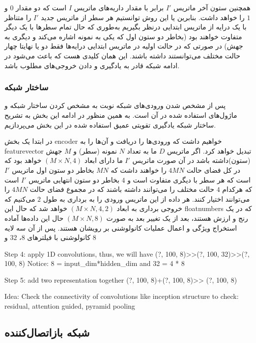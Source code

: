 همچنین ستون آخر ماتریس $I'$ برابر با مقدار داریه‌های ماتریس $I$ است که دو مقدار $0$ و $1$ را خواهد داشت. بنابرین یا این روش توانستیم هر سطر از ماتریس جدید $I'$ را متناظر با یک درایه از ماتریس ابتدایی درنظر بگیریم به‌طوری که حال تمام سطرها با یک دیگر متفاوت خواهند بود (بخاطر دو ستون اول که یکی به نمونه اشاره می‌کند و دیگری به جهش) در صورتی که در حالت اولیه در ماتریس ابتدایی درایه‌ها فقط دو یا نهایتا چهار حالت مختلف می‌توانستند داشته باشند. این همان کلیدی هست که باعث می‌شود در ادامه شبکه قادر به یادگیری و دادن خروجی‌های مطلوب باشد.

\subsubsection{ساختار شبکه}
پس از مشخص شدن ورودی‌های شبکه نوبت به مشخص کردن ساختار شبکه و ماژول‌های استفاده شده در آن است. به همین منظور در ادامه این بخش به تشریح ساختار شبکه یادگیری تقویتی عمیق استفاده شده در این بخش می‌پردازیم.

در ابتدا یک بخش \gls{encoder} خواهیم داشت که ورودی‌ها را دریافت و آن‌ها را به \gls{featurevector} تبدیل خواهد کرد.
اگر ماتریس $D$ ما به تعداد $N$ نمونه (سطر) و $M$ جهش (ستون)داشته باشد در آن صورت ماتریس $I'$ ما دارای ابعاد $(M\times N, 4)$ خواهد بود که در کل فضای حالت $4MN$ را خواهند داشت که $MN$ بخاطر دو ستون اول ماتریس $I'$ است که هر سطر با دیگری متفاوت است و $4$ بخاطر دو ستون انتهایی ماتریس $I'$ است که هرکدام $4$ حالت مختلف را می‌توانند داشته باشند که در مجموع فضای حالت $4MN$ را می‌توانند اختیار کنند. هر داده از این ماتریس ورودی را به برداری به طول $2$  می‌کنیم که خروجی برداری به ابعاد $(M\times N, 4, 2)$ خواهد شد که حال این  \glspl{floatnumber} که در یک رنج و ارزش هستند، بعد از یک تغییر بعد به صورت $(M\times N, 8)$ حال این داده‌ها آماده استخراج ویژگی و اعمال عملیات کانولوشنی بر رویشان هستند. 
پس از آن سه لایه کانولوشنی با فیلترهای $8$، $32$ و $8$ 

Step 4: apply 1D convolutions, thus, we will have (?, 100, 8)>>(?, 100, 32)>>(?, 100, 8)
Notice: 8 = input_dim*hidden_dim and 32 = 4 * 8

Step 5: add two representation together (?, 100, 8)+(?, 100, 8)>> (?, 100, 8)

Idea: Check the connectivity of convolutions like inception structure 
to check: residual, attention guided, pyramid pooling


\subsection{شبکه بازاتصال‌کننده}
\label{sec:ch_pm:reattach-network}

